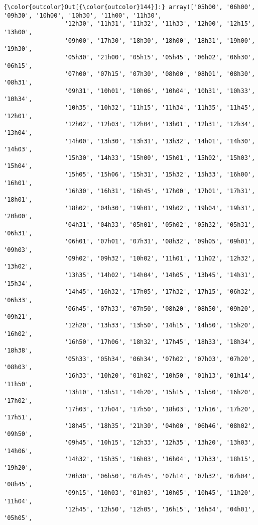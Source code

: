 \documentclass[11pt]{article}
\begin{document}
\begin{Verbatim}[commandchars=\\\{\}]
{\color{outcolor}Out[{\color{outcolor}144}]:} array(['05h00', '06h00', '09h30', '10h00', '10h30', '11h00', '11h30',
                 '12h30', '11h31', '11h32', '11h33', '12h00', '12h15', '13h00',
                 '09h00', '17h30', '18h30', '18h00', '18h31', '19h00', '19h30',
                 '05h30', '21h00', '05h15', '05h45', '06h02', '06h30', '06h15',
                 '07h00', '07h15', '07h30', '08h00', '08h01', '08h30', '08h31',
                 '09h31', '10h01', '10h06', '10h04', '10h31', '10h33', '10h34',
                 '10h35', '10h32', '11h15', '11h34', '11h35', '11h45', '12h01',
                 '12h02', '12h03', '12h04', '13h01', '12h31', '12h34', '13h04',
                 '14h00', '13h30', '13h31', '13h32', '14h01', '14h30', '14h03',
                 '15h30', '14h33', '15h00', '15h01', '15h02', '15h03', '15h04',
                 '15h05', '15h06', '15h31', '15h32', '15h33', '16h00', '16h01',
                 '16h30', '16h31', '16h45', '17h00', '17h01', '17h31', '18h01',
                 '18h02', '04h30', '19h01', '19h02', '19h04', '19h31', '20h00',
                 '04h31', '04h33', '05h01', '05h02', '05h32', '05h31', '06h31',
                 '06h01', '07h01', '07h31', '08h32', '09h05', '09h01', '09h03',
                 '09h02', '09h32', '10h02', '11h01', '11h02', '12h32', '13h02',
                 '13h35', '14h02', '14h04', '14h05', '13h45', '14h31', '15h34',
                 '14h45', '16h32', '17h05', '17h32', '17h15', '06h32', '06h33',
                 '06h45', '07h33', '07h50', '08h20', '08h50', '09h20', '09h21',
                 '12h20', '13h33', '13h50', '14h15', '14h50', '15h20', '16h02',
                 '16h50', '17h06', '18h32', '17h45', '18h33', '18h34', '18h38',
                 '05h33', '05h34', '06h34', '07h02', '07h03', '07h20', '08h03',
                 '16h33', '10h20', '01h02', '10h50', '01h13', '01h14', '11h50',
                 '13h10', '13h51', '14h20', '15h15', '15h50', '16h20', '17h02',
                 '17h03', '17h04', '17h50', '18h03', '17h16', '17h20', '17h51',
                 '18h45', '18h35', '21h30', '04h00', '06h46', '08h02', '09h50',
                 '09h45', '10h15', '12h33', '12h35', '13h20', '13h03', '14h06',
                 '14h32', '15h35', '16h03', '16h04', '17h33', '18h15', '19h20',
                 '20h30', '06h50', '07h45', '07h14', '07h32', '07h04', '08h45',
                 '09h15', '10h03', '01h03', '10h05', '10h45', '11h20', '11h04',
                 '12h45', '12h50', '12h05', '16h15', '16h34', '04h01', '05h05',

\end{Verbatim}
\end{document}
